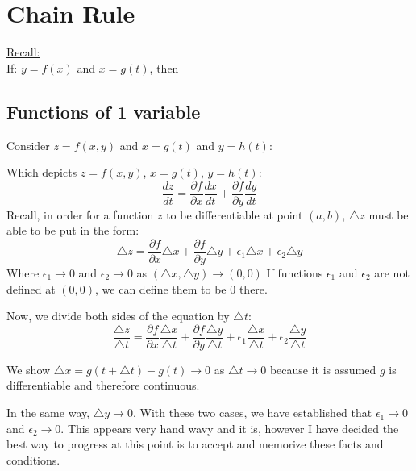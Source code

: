 \documentclass[12pt]{article}
\begin{document}
\section{Chain Rule}
\underline{Recall:} \\
If: \(y=f(x)\) and \(x=g(t)\), then 

\fbox{
	\begin{minipage}{1in}
	\[
		\frac{dy}{dt}=\frac{dy}{dx} * \frac{dx}{dt}
	\]
	\end{minipage}
}

\subsection{Functions of 1 variable}
Consider \(z=f(x,y)\) and \(x=g(t)\) and \(y=h(t)\):\\

Which depicts \(z=f(x,y)\), \(x=g(t)\), \(y=h(t)\):
\[
	\frac{dz}{dt} = \frac{\partial f}{\partial x} \frac{dx}{dt} + \frac{\partial f}{\partial y} \frac{dy}{dt}
\]
Recall, in order for a function \(z\) to be differentiable at point \((a,b)\), \(\triangle z\) must be able to be put in the form:
\[
	\triangle z = \frac{\partial f}{\partial x} \triangle x + \frac{\partial f}{\partial y} \triangle y + \epsilon_1\triangle x + \epsilon_2\triangle y
\]
Where \(\epsilon_1 \rightarrow 0\) and \(\epsilon_2 \rightarrow 0\) as \((\triangle x, \triangle y) \rightarrow (0,0)\)
If functions \(\epsilon_1\) and \(\epsilon_2\) are not defined at \((0,0)\), we can define them to be 0 there.

Now, we divide both sides of the equation by \(\triangle t\):
\[
	\frac{\triangle z}{\triangle t} = \frac{\partial f}{\partial x} \frac{\triangle x}{\triangle t} + \frac{\partial f}{\partial y} \frac{\triangle y }{\triangle t} + \epsilon_1 \frac{\triangle x}{\triangle t} + \epsilon_2 \frac{\triangle y }{\triangle t}
\]

We show \(\triangle x = g(t+\triangle t) - g(t) \rightarrow 0\) as \(\triangle t \rightarrow 0\) because it is assumed \(g\) is differentiable and therefore continuous.

In the same way, \(\triangle y \rightarrow 0\). With these two cases, we have established that \(\epsilon_1 \rightarrow 0\) and \(\epsilon_2 \rightarrow 0\). 
This appears very hand wavy and it is, however I have decided the best way to progress at this point is to accept and memorize these facts and conditions.
\end{document}
